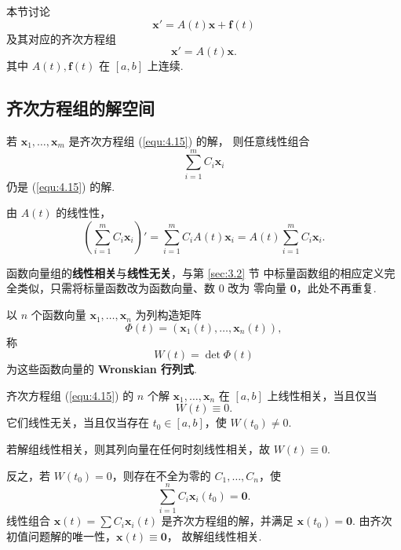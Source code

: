 本节讨论
\begin{equation}\label{equ:4.14}
\bm{x}'=A(t)\bm{x}+\bm{f}(t)
\end{equation}
及其对应的齐次方程组
\begin{equation}\label{equ:4.15}
\bm{x}'=A(t)\bm{x}.
\end{equation}
其中 $A(t),\bm{f}(t)$ 在 $[a,b]$ 上连续.

\subsection{齐次方程组的解空间}

\begin{thm}[(叠加原理)]\label{thm:4.3.1}
若 $\bm{x}_1,\ldots,\bm{x}_m$ 是齐次方程组 (\ref{equ:4.15}) 的解，
则任意线性组合
\[
\sum_{i=1}^m C_i\bm{x}_i
\]
仍是 (\ref{equ:4.15}) 的解.
\end{thm}

\begin{pf1}
由 $A(t)$ 的线性性，
\[
\left(\sum_{i=1}^m C_i\bm{x}_i\right)'
=\sum_{i=1}^m C_iA(t)\bm{x}_i
=A(t)\sum_{i=1}^m C_i\bm{x}_i.
\]
\end{pf1}

函数向量组的\textbf{线性相关}与\textbf{线性无关}，与第 \ref{sec:3.2} 节
中标量函数组的相应定义完全类似，只需将标量函数改为函数向量、数 $0$ 改为
零向量 $\bm{0}$，此处不再重复.

\begin{deff}
以 $n$ 个函数向量 $\bm{x}_1,\ldots,\bm{x}_n$ 为列构造矩阵
\[
\Phi(t)=(\bm{x}_1(t),\ldots,\bm{x}_n(t)),
\]
称
\[
W(t)=\det\Phi(t)
\]
为这些函数向量的 \textbf{Wronskian 行列式}.
\end{deff}

\begin{thm}\label{thm:4.3.2}
齐次方程组 (\ref{equ:4.15}) 的 $n$ 个解
$\bm{x}_1,\ldots,\bm{x}_n$ 在 $[a,b]$ 上线性相关，当且仅当
\[
W(t)\equiv0.
\]
它们线性无关，当且仅当存在 $t_0\in[a,b]$，使 $W(t_0)\ne0$.
\end{thm}

\begin{pf1}
若解组线性相关，则其列向量在任何时刻线性相关，故 $W(t)\equiv0$.

反之，若 $W(t_0)=0$，则存在不全为零的 $C_1,\ldots,C_n$，使
\[
\sum_{i=1}^n C_i\bm{x}_i(t_0)=\bm{0}.
\]
线性组合 $\bm{x}(t)=\sum C_i\bm{x}_i(t)$ 是齐次方程组的解，并满足
$\bm{x}(t_0)=\bm{0}$. 由齐次初值问题解的唯一性，$\bm{x}(t)\equiv\bm{0}$，
故解组线性相关.
\end{pf1}

